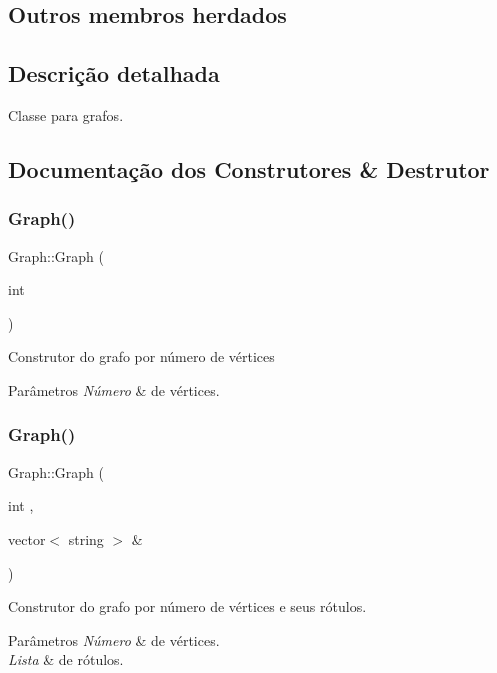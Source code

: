 \subsection*{Outros membros herdados}


\subsection{Descrição detalhada}
Classe para grafos. 

\subsection{Documentação dos Construtores \& Destrutor}
\mbox{\label{classGraph_a6381663d9f8215c377123a3a8107011c}} 
\subsubsection{\texorpdfstring{Graph()}{Graph()}\hspace{0.1cm}{\footnotesize\ttfamily [1/3]}}
{\footnotesize\ttfamily Graph\+::\+Graph (\begin{DoxyParamCaption}\item[{int}]{ }\end{DoxyParamCaption})}

Construtor do grafo por número de vértices 
\begin{DoxyParams}{Parâmetros}
{\em Número} & de vértices. \\
\hline
\end{DoxyParams}
\mbox{\label{classGraph_a0cb28a8601b14d0cb4291e5f60882ffc}} 
\subsubsection{\texorpdfstring{Graph()}{Graph()}\hspace{0.1cm}{\footnotesize\ttfamily [2/3]}}
{\footnotesize\ttfamily Graph\+::\+Graph (\begin{DoxyParamCaption}\item[{int}]{,  }\item[{vector$<$ string $>$ \&}]{ }\end{DoxyParamCaption})}

Construtor do grafo por número de vértices e seus rótulos. 
\begin{DoxyParams}{Parâmetros}
{\em Número} & de vértices. \\
\hline
{\em Lista} & de rótulos. \\
\hline
\end{DoxyParams}
\mbox{\label{classGraph_a0cd2695bebb326da026ed7391542aba6}} 

